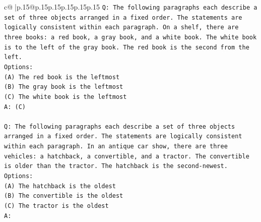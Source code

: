 \documentclass{article}
\begin{document}
{\begin{supertabular}{c@{$\;$}|p{.15\linewidth}@{}p{.15\linewidth}p{.15\linewidth}p{.15\linewidth}p{.15\linewidth}p{.15\linewidth}}
{{{\texttt{Q: The following paragraphs each describe a set of three objects arranged in a fixed order. The statements are logically consistent within each paragraph. On a shelf, there are three books: a red book, a gray book, and a white book. The white book is to the left of the gray book. The red book is the second from the left.} \\
\texttt{Options:} \\
\texttt{(A) The red book is the leftmost} \\
\texttt{(B) The gray book is the leftmost} \\
\texttt{(C) The white book is the leftmost} \\
\texttt{A: (C)} \\
\\ 
\texttt{Q: The following paragraphs each describe a set of three objects arranged in a fixed order. The statements are logically consistent within each paragraph. In an antique car show, there are three vehicles: a hatchback, a convertible, and a tractor. The convertible is older than the tractor. The hatchback is the second{-}newest.} \\
\texttt{Options:} \\
\texttt{(A) The hatchback is the oldest} \\
\texttt{(B) The convertible is the oldest} \\
\texttt{(C) The tractor is the oldest} \\
\texttt{A:} \\
            }
        }
    }
     \\ \\


\end{supertabular}}
\end{document}
